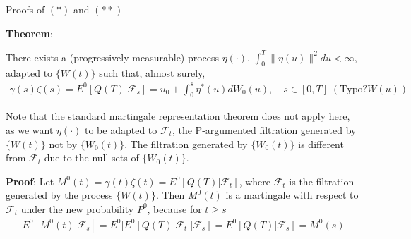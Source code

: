 \documentclass{beamer}
\begin{document}
\begin{frame}{Proofs of $(*)$ and $(**)$}

    {\footnotesize \footnotesize
   
    \par \textbf{Theorem}:
     \vspace{1em}
    \par There exists a (progressively measurable) process \(\eta(\cdot)\), 
    \(\int_0^T \|\eta(u)\|^2 du < \infty\), adapted to \(\{W(t)\}\) such that, almost surely,
    \begin{align*}
        \gamma(s) \zeta(s) = E^0[Q(T) | \mathcal{F}_s] = u_0 + \int_0^s \eta^*(u) dW_0(u), \quad s \in [0,T]\; (\text{Typo?}W(u))
    \end{align*}
     \vspace{1em}
    \par Note that the standard martingale representation theorem does not
     apply here, as we want \(\eta(\cdot)\) to be adapted to \(\mathcal{F}_t\), 
     the P-argumented filtration generated by \(\{W(t)\}\) not by \(\{W_0(t)\}\). 
     The filtration generated by \(\{W_0(t)\}\) is different from \(\mathcal{F}_t\) due to the null sets of \(\{W_0(t)\}\).
     \vspace{1em}
    \par \textbf{Proof}: Let $M^0(t) = \gamma(t) \zeta(t) = E^0[Q(T) | \mathcal{F}_t]$, where \(\mathcal{F}_t\) is 
    the filtration generated by the process \(\{W(t)\}\). 
    Then \(M^0(t)\) is a martingale with respect to \(\mathcal{F}_t\) under the new probability \(P^0\), because for \(t \geq s\)
    \begin{align*}
        E^0[M^0(t) | \mathcal{F}_s] = E^0[E^0[Q(T) | \mathcal{F}_t] | \mathcal{F}_s] = E^0[Q(T) | \mathcal{F}_s] = M^0(s)
    \end{align*}
    }

\end{frame}
\end{document}
